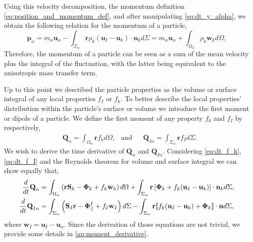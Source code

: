 Using this velocity decomposition, the momentum definition \ref{eq:position_and_momentum_def}, and after manipulating \ref{eq:dt_y_alpha}, we obtain the following relation for the momentum of a particle,
\begin{equation}
    \textbf{p}_\alpha
    =  m_\alpha \textbf{u}_\alpha
    - \int_{\Sigma_\alpha} \textbf{r} \rho_k (\textbf{u}_I - \textbf{u}_k)\cdot \textbf{n}_k d\Sigma
    = m_\alpha \textbf{u}_\alpha
    + \int_{\Omega_\alpha} \rho_k \textbf{w}_k d\Omega,
    \label{eq:momentum_definition}
\end{equation}
Therefore, the momentum of a particle can be seen as a sum of the mean velocity plus the integral of the fluctuation, with the latter being equivalent to the anisotropic mass transfer term. 

Up to this point we described the particle properties as the volume or surface integral of any local properties $f_I$ or $f_k$.
To better describe the local properties' distribution within the particle's surface or volume we introduce the first moment or dipole of a particle. 
We define the first moment of any property $f_k$ and $f_I$ by respectively,
\begin{align}
    &\textbf{Q}_\alpha 
    = \int_{\Omega_\alpha} \textbf{r} f_k d\Omega,
    &\text{and}&
    &\textbf{Q}_{I\alpha}
    = \int_{\Sigma_\alpha} \textbf{r} f_I d\Sigma.
    \label{eq:first_moment_definition}
\end{align}
We wish to derive the time derivative of $\textbf{Q}_\alpha$ and $\textbf{Q}_{I\alpha}$. 
Considering \ref{eq:dt_f_k}, \ref{eq:dt_f_I} and the Reynolds theorem for volume and surface integral we can show equally that,
\begin{align}
    \frac{d}{d t} \textbf{Q}_\alpha
    &= \int_{\Omega_\alpha} \left( 
        \textbf{r} \textbf{S}_k 
        - \bm{\Phi}_k
        + f_k  \textbf{w}_k 
    \right) d\Omega
    + \int_{\Sigma_\alpha} \textbf{r} \left[
        \bm{\Phi}_k
        + f_k (\textbf{u}_I-\textbf{u}_k)
    \right]\cdot \textbf{n}_k  d\Sigma,
    \label{eq:dt_Q_alpha}\\
    \frac{d}{d t} \textbf{Q}_{I\alpha}
    &= \int_{\Sigma_\alpha} \left(
        \textbf{S}_I\textbf{r}
        - \mathbf{\Phi}_{||}^I
        + f_I \textbf{w}_I
    \right) d\Sigma
    - \int_{\Sigma_\alpha}\textbf{r} \llbracket 
        f_k (\textbf{u}_I - \textbf{u}_k)
        + \mathbf{\Phi}_k
     \rrbracket \cdot \textbf{n}
    d\Sigma,
    \label{eq:dt_Q_I_alpha}
\end{align}
where $\textbf{w}_I = \textbf{u}_I - \textbf{u}_\alpha$.
Since the derivation of those equations are not trivial, we provide some details in \ref{ap:moment_derivative}. 
